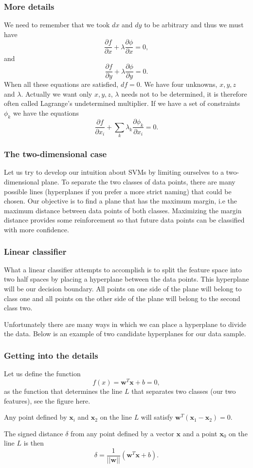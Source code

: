 \documentclass{beamer}
\begin{document}
\begin{frame}
\frametitle{More details}

We need to remember that we took $dx$ and $dy$ to be arbitrary and thus we must have
\[
\frac{\partial f}{\partial x}+\lambda\frac{\partial \phi}{\partial x} =0,
\]
and
\[
\frac{\partial f}{\partial y}+\lambda\frac{\partial \phi}{\partial y} =0.
\]
When all these equations are satisfied, $df=0$.  We have four unknowns, $x,y,z$ and
$\lambda$. Actually we want only $x,y,z$, $\lambda$ needs not to be determined, 
it is therefore often called
Lagrange's undetermined multiplier.
If we have a set of constraints $\phi_k$ we have the equations
\[
\frac{\partial f}{\partial x_i}+\sum_k\lambda_k\frac{\partial \phi_k}{\partial x_i} =0.
\]
\end{frame}

\begin{frame}
\frametitle{The two-dimensional case}

Let us try to develop our intuition about SVMs by limiting ourselves to a two-dimensional
plane.  To separate the two classes of data points, there are many
possible lines (hyperplanes if you prefer a more strict naming)  
that could be chosen. Our objective is to find a
plane that has the maximum margin, i.e the maximum distance between
data points of both classes. Maximizing the margin distance provides
some reinforcement so that future data points can be classified with
more confidence.
\end{frame}

\begin{frame}
\frametitle{Linear classifier}

What a linear classifier attempts to accomplish is to split the
feature space into two half spaces by placing a hyperplane between the
data points.  This hyperplane will be our decision boundary.  All
points on one side of the plane will belong to class one and all points
on the other side of the plane will belong to the second class two.

Unfortunately there are many ways in which we can place a hyperplane
to divide the data.  Below is an example of two candidate hyperplanes
for our data sample.
\end{frame}

\begin{frame}
\frametitle{Getting into the details}

Let us define the function
\[
f(x) = \bm{w}^T\bm{x}+b = 0,
\]
as the function that determines the line $L$ that separates two classes (our two features), see the figure here. 

Any point defined by $\bm{x}_i$ and $\bm{x}_2$ on the line $L$ will satisfy $\bm{w}^T(\bm{x}_1-\bm{x}_2)=0$. 

The signed distance $\delta$ from any point defined by a vector $\bm{x}$ and a point $\bm{x}_0$ on the line $L$ is then
\[
\delta = \frac{1}{\vert\vert \bm{w}\vert\vert}(\bm{w}^T\bm{x}+b).
\]
\end{frame}
\end{document}
